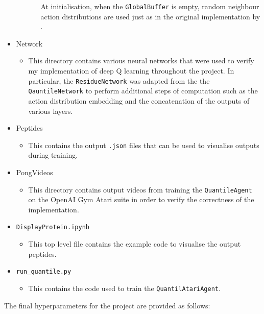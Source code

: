 \begin{itemize}
\begin{itemize}
\begin{itemize}
            At initialisation, when the \texttt{GlobalBuffer} is empty, random 
            neighbour action distributions are used just as in the original
            implementation by \cite{Yang2018}.
        \end{itemize}
    \end{itemize}
    \item Network
    \begin{itemize}
        \item This directory contains various neural networks that were
        used to verify my implementation of deep Q learning throughout the
        project. In particular, the \texttt{ResidueNetwork} was adapted
        from the the \texttt{QauntileNetwork} to perform additional
        steps of computation such as the action distribution embedding
        and the concatenation of the outputs of various layers. 
    \end{itemize}
    \item Peptides
    \begin{itemize}
        \item This contains the output \texttt{.json} files that can be 
        used to visualise outputs during training.
    \end{itemize}
    \item PongVideos 
    \begin{itemize}
        \item This directory contains output videos from training
        the \texttt{QuantileAgent} on the OpenAI Gym
        Atari suite in order to verify the correctness of the implementation.
    \end{itemize}
    \item \texttt{DisplayProtein.ipynb}
    \begin{itemize}
        \item This top level file contains the example code to visualise
        the output peptides.
    \end{itemize}
    \item \texttt{run\_quantile.py}
    \begin{itemize}
        \item This contains the code used to train the \texttt{QuantilAtariAgent}.
    \end{itemize}
\end{itemize}

The final hyperparameters for the project are provided as follows:

